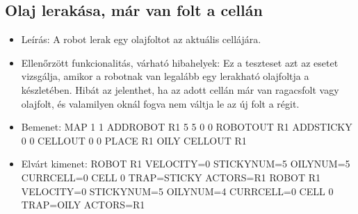 \subsection{Olaj lerakása, már van folt a cellán}
\begin{itemize}
	\item Leírás: \newline
A robot lerak egy olajfoltot az aktuális cellájára.

	\item Ellenőrzött funkcionalitás, várható hibahelyek: \newline
Ez a teszteset azt az esetet vizsgálja, amikor a robotnak van legalább egy lerakható olajfoltja a készletében. Hibát az jelenthet, ha az adott cellán már van ragacsfolt vagy olajfolt, és valamilyen oknál fogva nem váltja le az új folt a régit.

	\item Bemenet: \newline
MAP 1 1 \newline
ADDROBOT R1 5 5 0 0	 \newline
ROBOTOUT R1 \newline
ADDSTICKY 0 0 \newline
CELLOUT 0 0 \newline
PLACE R1 OILY \newline
CELLOUT R1

	\item Elvárt kimenet: \newline
ROBOT R1 VELOCITY=0 STICKYNUM=5 OILYNUM=5 CURRCELL=0 \newline
CELL 0 TRAP=STICKY ACTORS=R1 \newline 
ROBOT R1 VELOCITY=0 STICKYNUM=5 OILYNUM=4 CURRCELL=0 \newline
CELL 0 TRAP=OILY ACTORS=R1	

\end{itemize}

